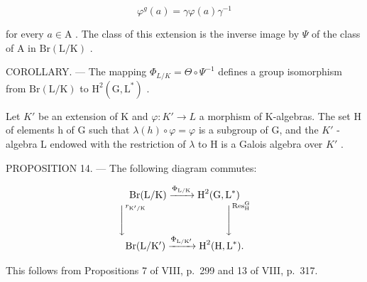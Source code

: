 \[
\varphi^ {g} (a) = \gamma \varphi (a) \gamma^ {- 1}
\]

for every \(a \in \mathrm{A}\) . The class of this extension is the inverse image by \(\Psi\) of the class of \(\mathrm{A}\) in \(\mathrm{Br}(\mathrm{L} / \mathrm{K})\) .

COROLLARY. --- The mapping \(\Phi_{L/K} = \Theta \circ \Psi^{-1}\) defines a group isomorphism from \(\mathrm{Br}(\mathrm{L}/\mathrm{K})\) to \(\mathrm{H}^{2}(\mathrm{G}, \mathrm{L}^{*})\) .

Let \(K'\) be an extension of K and \(\varphi: K' \to L\) a morphism of K-algebras. The set H of elements h of G such that \(\lambda(h) \circ \varphi = \varphi\) is a subgroup of G, and the \(K'\) -algebra L endowed with the restriction of \(\lambda\) to H is a Galois algebra over \(K'\) .

PROPOSITION 14. --- The following diagram commutes:

\[
\begin{array}{c} \operatorname{Br} (\mathrm{L} / \mathrm{K}) \xrightarrow {\Phi_ {\mathrm{L} / \mathrm{K}}} \operatorname{H} ^ {2} (\operatorname{G}, \operatorname{L} ^ {*}) \\ \Biggl \downarrow^ {r _ {\mathrm{K} ^ {\prime} / \mathrm{K}}} \qquad \qquad \qquad \qquad \Biggl \downarrow^ {\operatorname{Res} _ {\mathrm{H}} ^ {\mathrm{G}}} \\ \operatorname{Br} (\mathrm{L} / \mathrm{K} ^ {\prime}) \xrightarrow {\Phi_ {\mathrm{L} / \mathrm{K} ^ {\prime}}} \operatorname{H} ^ {2} (\operatorname{H}, \operatorname{L} ^ {*})  . \end{array}
\]

This follows from Propositions 7 of VIII, p.~299 and 13 of VIII, p.~317.

